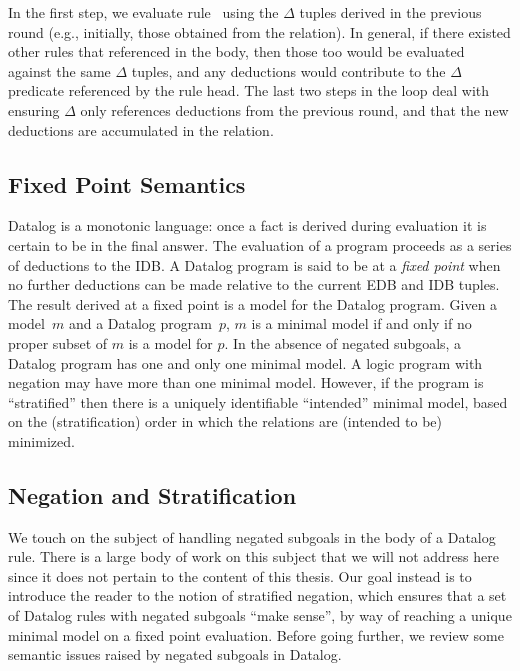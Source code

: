In the first step, we evaluate rule~ using the $\Delta$ tuples
derived in the previous round (e.g., initially, those obtained from the
 relation).  In general, if there existed other rules that referenced
 in the body, then those too would be evaluated against the same
$\Delta$ tuples, and any deductions would contribute to the $\Delta$
predicate referenced by the rule head.  The last two steps in the loop deal
with ensuring $\Delta$ only references deductions from the previous
round, and that the new deductions are accumulated in the  relation.


\subsection{Fixed Point Semantics}

Datalog is a monotonic language: once a fact is derived during evaluation it is
certain to be in the final answer.  The evaluation of a program proceeds as a
series of deductions to the IDB.  A Datalog program is said to be at a {\em
fixed point} when no further deductions can be made relative to the current EDB
and IDB tuples.  The result derived at a fixed point is a model for the Datalog
program.  Given a model~$m$ and a Datalog program~$p$, $m$ is a minimal model
if and only if no proper subset of $m$ is a model for $p$.  In the absence of
negated subgoals, a Datalog program has one and only one minimal model.  A
logic program with negation may have more than one minimal model. However, if
the program is ``stratified'' then there is a uniquely identifiable
``intended'' minimal model, based on the (stratification) order in which the
relations are (intended to be) minimized.~\cite{deductive-database}


\subsection{Negation and Stratification}

We touch on the subject of handling negated subgoals in the body of a Datalog
rule.  There is a large body of work on this subject that we will not address
here since it does not pertain to the content of this thesis.  Our goal instead
is to introduce the reader to the notion of stratified negation, which ensures
that a set of Datalog rules with negated subgoals ``make sense'', by way of
reaching a unique minimal model on a fixed point evaluation.  Before going
further, we review some semantic issues raised by negated subgoals in Datalog.

